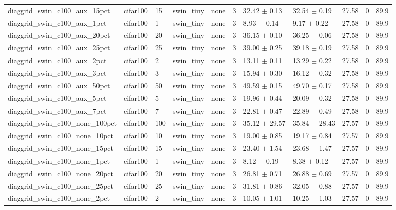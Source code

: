 \begin{tabular}{lllllllllll}
diaggrid_swin_c100_aux_15pct & cifar100 & 15 & swin_tiny & none & 3 & 32.42 $\pm$ 0.13 & 32.54 $\pm$ 0.19 & 27.58 & 0 & 89.9 \\
diaggrid_swin_c100_aux_1pct & cifar100 & 1 & swin_tiny & none & 3 & 8.93 $\pm$ 0.14 & 9.17 $\pm$ 0.22 & 27.58 & 0 & 89.9 \\
diaggrid_swin_c100_aux_20pct & cifar100 & 20 & swin_tiny & none & 3 & 36.15 $\pm$ 0.10 & 36.25 $\pm$ 0.06 & 27.58 & 0 & 89.9 \\
diaggrid_swin_c100_aux_25pct & cifar100 & 25 & swin_tiny & none & 3 & 39.00 $\pm$ 0.25 & 39.18 $\pm$ 0.19 & 27.58 & 0 & 89.9 \\
diaggrid_swin_c100_aux_2pct & cifar100 & 2 & swin_tiny & none & 3 & 13.11 $\pm$ 0.11 & 13.29 $\pm$ 0.22 & 27.58 & 0 & 89.9 \\
diaggrid_swin_c100_aux_3pct & cifar100 & 3 & swin_tiny & none & 3 & 15.94 $\pm$ 0.30 & 16.12 $\pm$ 0.32 & 27.58 & 0 & 89.9 \\
diaggrid_swin_c100_aux_50pct & cifar100 & 50 & swin_tiny & none & 3 & 49.59 $\pm$ 0.15 & 49.70 $\pm$ 0.17 & 27.58 & 0 & 89.9 \\
diaggrid_swin_c100_aux_5pct & cifar100 & 5 & swin_tiny & none & 3 & 19.96 $\pm$ 0.44 & 20.09 $\pm$ 0.32 & 27.58 & 0 & 89.9 \\
diaggrid_swin_c100_aux_7pct & cifar100 & 7 & swin_tiny & none & 3 & 22.81 $\pm$ 0.47 & 22.89 $\pm$ 0.49 & 27.58 & 0 & 89.9 \\
diaggrid_swin_c100_none_100pct & cifar100 & 100 & swin_tiny & none & 3 & 35.12 $\pm$ 29.57 & 35.84 $\pm$ 28.43 & 27.57 & 0 & 89.9 \\
diaggrid_swin_c100_none_10pct & cifar100 & 10 & swin_tiny & none & 3 & 19.00 $\pm$ 0.85 & 19.17 $\pm$ 0.84 & 27.57 & 0 & 89.9 \\
diaggrid_swin_c100_none_15pct & cifar100 & 15 & swin_tiny & none & 3 & 23.40 $\pm$ 1.54 & 23.68 $\pm$ 1.47 & 27.57 & 0 & 89.9 \\
diaggrid_swin_c100_none_1pct & cifar100 & 1 & swin_tiny & none & 3 & 8.12 $\pm$ 0.19 & 8.38 $\pm$ 0.12 & 27.57 & 0 & 89.9 \\
diaggrid_swin_c100_none_20pct & cifar100 & 20 & swin_tiny & none & 3 & 26.81 $\pm$ 0.71 & 26.88 $\pm$ 0.69 & 27.57 & 0 & 89.9 \\
diaggrid_swin_c100_none_25pct & cifar100 & 25 & swin_tiny & none & 3 & 31.81 $\pm$ 0.86 & 32.05 $\pm$ 0.88 & 27.57 & 0 & 89.9 \\
diaggrid_swin_c100_none_2pct & cifar100 & 2 & swin_tiny & none & 3 & 10.05 $\pm$ 1.01 & 10.25 $\pm$ 1.03 & 27.57 & 0 & 89.9 \\

\end{tabular}
